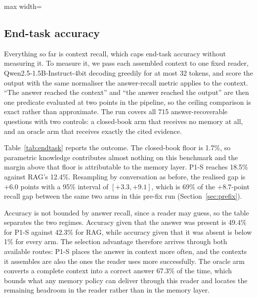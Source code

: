 \begin{table}[t]
\caption{The pooled learned scorer (P3) against the P1 heuristic across the
store budget $S$, answer recall (\%), context 2048, same protocol as
Table~\ref{tab:transfer}. $\Delta$ is P3 minus P1 with 95\% intervals
resampled by conversation; bold excludes zero.}
\label{tab:transfer-budget}
\centering
\small
\begin{adjustbox}{max width=\columnwidth}\end{adjustbox}
\end{table}

\subsection{End-task accuracy}
\label{sec:endtask}

Everything so far is context recall, which caps end-task accuracy without
measuring it. To measure it, we pass each assembled context to one fixed reader,
Qwen2.5-1.5B-Instruct-4bit decoding greedily for at most 32 tokens, and score
the output with the same normaliser the answer-recall metric applies to the
context. ``The answer reached the context'' and ``the answer reached the
output'' are then one predicate evaluated at two points in the pipeline, so the
ceiling comparison is exact rather than approximate. The run covers all 715
answer-recoverable questions with two controls: a closed-book arm that receives
no memory at all, and an oracle arm that receives exactly the cited evidence.

Table~\ref{tab:endtask} reports the outcome. The closed-book floor is 1.7\%,
so parametric knowledge contributes almost nothing on this benchmark and the
margin above that floor is attributable to the memory layer. P1-S reaches
18.5\% against RAG's 12.4\%. Resampling by conversation as before, the realised
gap is $+6.0$ points with a 95\% interval of $[+3.3, +9.1]$, which is 69\% of
the $+8.7$-point recall gap between the same two arms in this pre-fix run
(Section~\ref{sec:prefix}).

Accuracy is not bounded by answer recall, since a reader may guess, so the
table separates the two regimes. Accuracy given that the answer was present is
49.4\% for P1-S against 42.3\% for RAG, while accuracy given that it was absent
is below 1\% for every arm. The selection advantage therefore arrives through
both available routes: P1-S places the answer in context more often, and the
contexts it assembles are also the ones the reader uses more successfully. The
oracle arm converts a complete context into a correct answer 67.3\% of the
time, which bounds what any memory policy can deliver through this reader and
locates the remaining headroom in the reader rather than in the memory layer.

